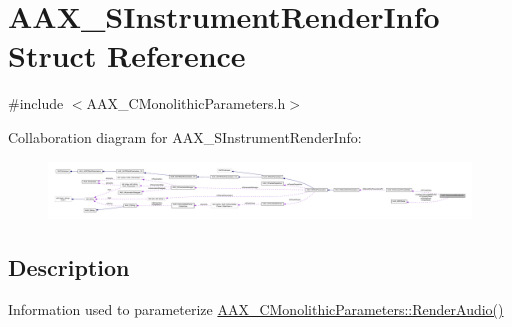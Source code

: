 \hypertarget{a00123}{}\section{A\+A\+X\+\_\+\+S\+Instrument\+Render\+Info Struct Reference}
\label{a00123}


{\ttfamily \#include $<$A\+A\+X\+\_\+\+C\+Monolithic\+Parameters.\+h$>$}



Collaboration diagram for A\+A\+X\+\_\+\+S\+Instrument\+Render\+Info\+:
\nopagebreak
\begin{figure}[H]
\begin{center}
\leavevmode
\includegraphics[width=350pt]{a00676}
\end{center}
\end{figure}


\subsection{Description}
Information used to parameterize \hyperlink{a00026_a04f2f73d70ea28c17747c68fc3a20fc8}{A\+A\+X\+\_\+\+C\+Monolithic\+Parameters\+::\+Render\+Audio()} 

